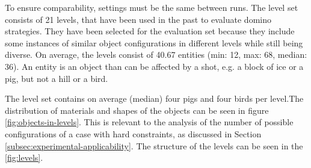 To ensure comparability, settings must be the same between runs.
The level set consists of 21 levels, that have been used in the past to evaluate domino strategies. They have been selected for the evaluation set because they include some instances of similar object configurations in different levels while still being diverse.
On average, the levels consist of 40.67 entities (min: 12, max: 68, median: 36). An entity is an object than can be affected by a shot, e.g. a block of ice or a pig, but not a hill or a bird.

The level set contains on average (median) four pigs and four birds per level.The distribution of materials and shapes of the objects can be seen in figure \ref{fig:objects-in-levels}. This is relevant to the analysis of the number of possible configurations of a case with hard constraints, as discussed in Section \ref{subsec:experimental-applicability}.
The structure of the levels can be seen in the \ref{fig:levels}.

